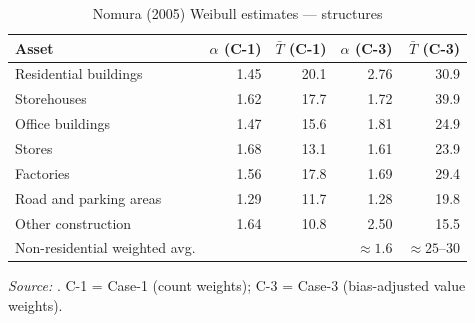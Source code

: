 \begin{table}[htbp]
\centering
\caption{Nomura (2005) Weibull estimates --- structures}
\label{tab:ret:nomura_structures}
\begin{threeparttable}
\begin{tabular}{lrrrr}
\toprule
Asset & $\alpha$ (C-1) & $\bar{T}$ (C-1) & $\alpha$ (C-3) & $\bar{T}$ (C-3) \\
\midrule
Residential buildings     & 1.45 & 20.1 & 2.76 & 30.9 \\
Storehouses               & 1.62 & 17.7 & 1.72 & 39.9 \\
Office buildings           & 1.47 & 15.6 & 1.81 & 24.9 \\
Stores                     & 1.68 & 13.1 & 1.61 & 23.9 \\
Factories                  & 1.56 & 17.8 & 1.69 & 29.4 \\
Road and parking areas     & 1.29 & 11.7 & 1.28 & 19.8 \\
Other construction         & 1.64 & 10.8 & 2.50 & 15.5 \\
\midrule
Non-residential weighted avg. & & & $\approx 1.6$ & $\approx 25$--$30$ \\
\bottomrule
\end{tabular}
\begin{tablenotes}
\small
\item \textit{Source:} \citet[Tables~3 and~7]{Nomura2005}. C-1 = Case-1
(count weights); C-3 = Case-3 (bias-adjusted value weights).
\end{tablenotes}
\end{threeparttable}
\end{table}

